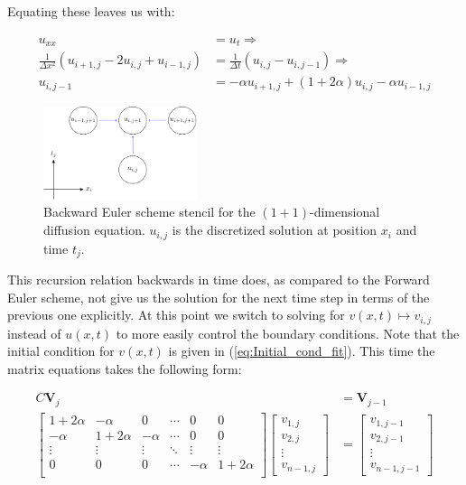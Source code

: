 \documentclass[a4paper, 11pt, notitlepage,english]{article}
\begin{document}
Equating these leaves us with:

\begin{align}
u_{xx} &= u_t \Rightarrow \\
 \frac{1}{\Delta x^2} (u_{i+1,j}-2u_{i,j}+u_{i-1,j}) &= \frac{1}{\Delta t} (u_{i,j}-u_{i,j-1}) \Rightarrow \\
 u_{i,j-1} &= -\alpha u_{i+1,j} + (1+2\alpha)u_{i,j} - \alpha u_{i-1,j}
\label{eq:Backward_Euler_scheme}
\end{align}

\begin{figure}[h!tb]
 \centering
 \includegraphics[width=0.4\textwidth]{Grid_BE-figure0}
 \caption{Backward Euler scheme stencil for the $(1+1)$-dimensional diffusion equation. $u_{i,j}$ is the discretized solution at position $x_i$ and time $t_j$.}
 \label{fig:BE_grid}
\end{figure}

This recursion relation backwards in time does, as compared to the Forward Euler scheme, not give us the solution for the next time step in terms of the previous one explicitly. 
At this point we switch to solving for $v(x,t) \mapsto v_{i,j}$ instead of $u(x,t)$ to more easily control the boundary conditions. Note that the initial condition for $v(x,t)$ is given in (\ref{eq:Initial_cond_fit}). This time the matrix equations takes the following form:

\begin{align}
C \boldsymbol{V}_j &= \boldsymbol{V}_{j-1} \\
\begin{bmatrix}
 1+2\alpha & -\alpha & 0 & \cdots & 0 & 0 \\
 -\alpha & 1+2\alpha & -\alpha & \cdots & 0 & 0 \\
 \vdots & \vdots & \vdots & \ddots & \vdots & \vdots \\
 0 & 0 & 0 & \cdots & -\alpha & 1+2\alpha \\
\end{bmatrix}
\begin{bmatrix}
v_{1,j} \\ v_{2,j} \\ \vdots \\ v_{n-1,j}
\end{bmatrix}
&=
\begin{bmatrix}
v_{1,j-1} \\ v_{2,j-1} \\ \vdots \\ v_{n-1,j-1}
\end{bmatrix}
\label{eq:Backwards_Euler_matrix}
\end{align}
\end{document}
